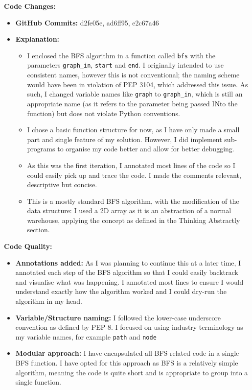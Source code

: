 \textbf{Code Changes:}
\begin{itemize}
    \item \textbf{GitHub Commits:} d2fe05e, ad6ff95, e2c67a46
    \item \textbf{Explanation:}
    \begin{itemize}
        \item I enclosed the BFS algorithm in a function called \verb|bfs| with the parameters \verb|graph_in|, \verb|start| and \verb|end|. I originally intended to use consistent names, however this is not conventional; the naming scheme would have been in violation of PEP 3104, which addressed this issue. As such, I changed variable names like \verb|graph| to \verb|graph_in|, which is still an appropriate name (as it refers to the parameter being passed INto the function) but does not violate Python conventions.
        \item I chose a basic function structure for now, as I have only made a small part and single feature of my solution. However, I did implement sub-programs to organise my code better and allow for better debugging.
		\item As this was the first iteration, I annotated most lines of the code so I could easily pick up and trace the code. I made the comments relevant, descriptive but concise.
		\item This is a mostly standard BFS algorithm, with the modification of the data structure: I used a 2D array as it is an abstraction of a normal warehouse, applying the concept as defined in the Thinking Abstractly section.
    \end{itemize}
\end{itemize}

\textbf{Code Quality:}
\begin{itemize}
    \item \textbf{Annotations added:} As I was planning to continue this at a later time, I annotated each step of the BFS algorithm so that I could easily backtrack and visualise what was happening. I annotated most lines to ensure I would understand exactly how the algorithm worked and I could dry-run the algorithm in my head.
    \item \textbf{Variable/Structure naming:} I followed the lower-case underscore convention as defined by PEP 8. I focused on using industry terminology as my variable names, for example \verb|path| and \verb|node| 
    \item \textbf{Modular approach:} I have encapsulated all BFS-related code in a single BFS function. I have opted for this approach as BFS is a relatively simple algorithm, meaning the code is quite short and is appropriate to group into a single function.
\end{itemize}

